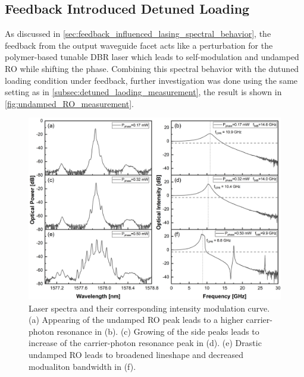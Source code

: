 \subsection{Feedback Introduced Detuned Loading}\label{subsec:feedback_introduced_detuned_loading_measurement}
As discussed in \autoref{sec:feedback_influenced_lasing_spectral_behavior}, the feedback from the output waveguide facet acts like a perturbation for the polymer-based tunable DBR laser which leads to self-modulation and undamped RO while shifting the phase. Combining this spectral behavior with the dutuned loading condition under feedback, further investigation was done using the same setting as in \autoref{subsec:detuned_laoding_measurement}, the result is shown in \autoref{fig:undamped_RO_measurement}.

\begin{figure}[ht]
    \centering
    \includegraphics[width=\linewidth]{figures/Undamped_RO_and_bandwidth_grating_4621.png}
    \caption{Laser spectra and their corresponding intensity modulation curve. (a) Appearing of the undamped RO peak leads to a higher carrier-photon resonance in (b). (c) Growing of the side peaks leads to increase of the carrier-photon resonance peak in (d). (e) Drastic undamped RO leads to broadened lineshape and decreased modualiton bandwidth in (f).}
    \label{fig:undamped_RO_measurement}
\end{figure}

